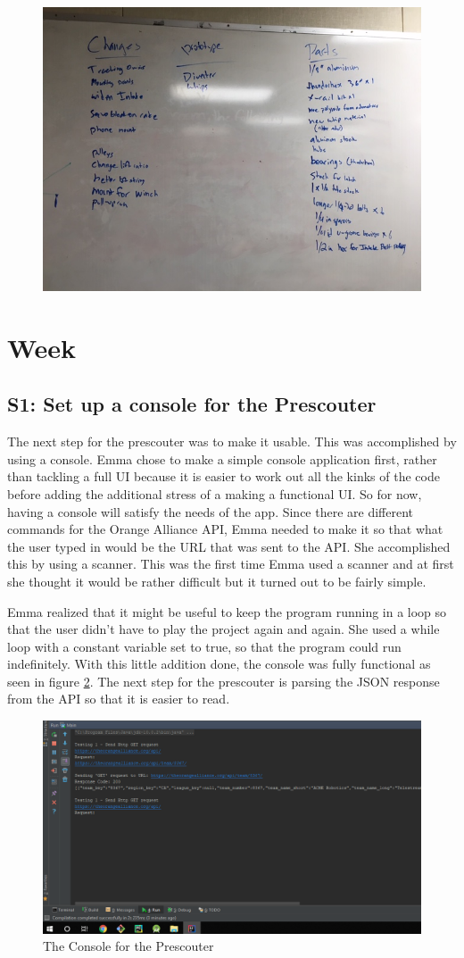 \documentclass{article}
\begin{document}
\begin{figure}
    \centering
    \includegraphics[width=.6 \textwidth]{14_12-03/images/IMG_0422.JPG}
    \caption{}
    \label{fig: Parts list}
\end{figure}
\clearpage \newpage \section{Week \thesection} 
\subsection{S1: Set up a console for the Prescouter}

The next step for the prescouter was to make it usable. This was accomplished by using a console. Emma chose to make a simple console application first, rather than tackling a full UI because it is easier to work out all the kinks of the code before adding the additional stress of a making a functional UI. So for now, having a console will satisfy the needs of the app. Since there are different commands for the Orange Alliance API, Emma needed to make it so that what the user typed in would be the URL that was sent to the API. She accomplished this by using a scanner. This was the first time Emma used a scanner and at first she thought it would be rather difficult but it turned out to be fairly simple. 

Emma realized that it might be useful to keep the program running in a loop so that the user didn't have to play the project again and again. She used a while loop with a constant variable set to true, so that the program could run indefinitely. With this little addition done, the console was fully functional as seen in figure \ref{fig:console}. The next step for the prescouter is parsing the JSON response from the API so that it is easier to read. 

\begin{figure}
    \centering
    \includegraphics[width=.6 \textwidth]{15_12-10/images/console.png}
    \caption{The Console for the Prescouter}
    \label{fig:console}
\end{figure}
\end{document}
